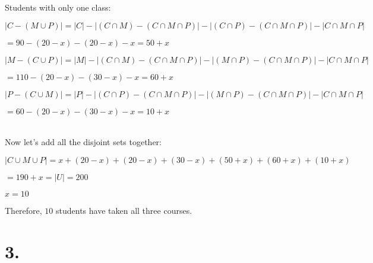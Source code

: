 \documentclass{article}
\newenvironment{Solution}
{\noindent\color{red}}
{\newline}
\begin{document}
\begin{Solution}
\begin{adjustwidth}{2em}{0em}
        Students with only one class:

        \begin{adjustwidth}{2em}{0em}
            $|C - (M \cup P)|  = |C| - |(C \cap M) - (C \cap M \cap P)| - |(C \cap P) - (C \cap M \cap P)| - |C \cap M \cap P|$

            \hspace*{6.585em}$ = 90 - (20 - x) - (20 - x) - x = 50 + x$

            $|M - (C \cup P)| = |M| - |(C \cap M) - (C \cap M \cap P)| - |(M \cap P)- (C \cap M \cap P)| - |C \cap M \cap P|$

            \hspace*{6.585em}$ = 110 - (20 - x) - (30 - x) - x = 60 + x$

            $|P - (C \cup M)| = |P| - |(C \cap P) - (C \cap M \cap P)| - |(M \cap P)- (C \cap M \cap P)| - |C \cap M \cap P|$

            \hspace*{6.585em}$ = 60 - (20 - x) - (30 - x) - x = 10 + x$
        \end{adjustwidth}
    \end{adjustwidth}

    \ \\

    Now let's add all the disjoint sets together:

    $|C \cup M \cup P| = x + (20 - x) + (20 - x) + (30 - x) + (50 + x) + (60 + x) + (10 + x)$

    \phantom{ }

    \hspace*{5.71em}$= 190 + x = |U| = 200$

    \phantom{ }

    \hspace*{5.71em}$x = 10$

    \phantom{ }

    Therefore, $10$ students have taken all three courses. 
\end{Solution}







\vspace*{5em}




\section*{3. }
\end{document}
